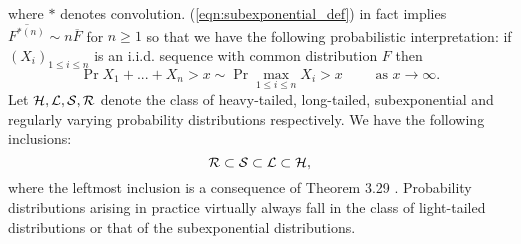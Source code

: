 where $*$ denotes convolution. (\ref{eqn:subexponential_def}) in fact implies $\overline{F^{* (n)}} \sim n \overline{F}$ for $n \geq 1$ so that we have the following probabilistic interpretation: if $(X_i)_{1 \leq i \leq n}$ is an i.i.d. sequence with common distribution $F$ then 
\begin{equation}
\Pr{X_1 + ... + X_n > x} \sim \Pr{\max\limits_{1 \leq i \leq n} X_i > x} \qquad\text{ as } x \to \infty. 
\end{equation}
Let $\cal{H}, \cal{L}, \cal{S}, \cal{R}$ denote the class of heavy-tailed, long-tailed, subexponential and regularly varying probability distributions respectively. We have the following inclusions:
\begin{equation}
\cal{R} \subset \cal{S} \subset \cal{L} \subset \cal{H}, 
\end{equation}
where the leftmost inclusion is a consequence of Theorem 3.29 \cite{foss2011introduction}. Probability distributions arising in practice virtually always fall in the class of light-tailed distributions or that of the subexponential distributions.  








